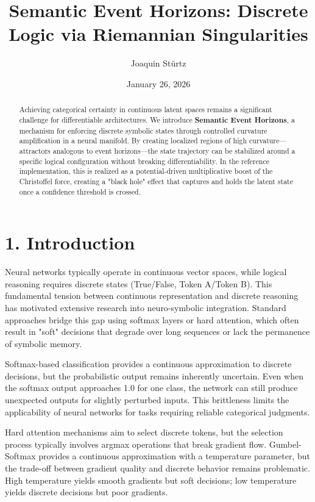 \documentclass[12pt,letterpaper,twoside]{article}
\title{Semantic Event Horizons: Discrete Logic via Riemannian Singularities}
\author{Joaquin Stürtz}
\date{January 26, 2026}
\affil{Independent Researcher}
\begin{document}
\maketitle

\begin{abstract}
Achieving categorical certainty in continuous latent spaces remains a significant challenge for differentiable architectures. We introduce \textbf{Semantic Event Horizons}, a mechanism for enforcing discrete symbolic states through controlled curvature amplification in a neural manifold. By creating localized regions of high curvature—attractors analogous to event horizons—the state trajectory can be stabilized around a specific logical configuration without breaking differentiability. In the reference implementation, this is realized as a potential-driven multiplicative boost of the Christoffel force, creating a "black hole" effect that captures and holds the latent state once a confidence threshold is crossed.
\end{abstract}

\section{1. Introduction}

Neural networks typically operate in continuous vector spaces, while logical reasoning requires discrete states (True/False, Token A/Token B). This fundamental tension between continuous representation and discrete reasoning has motivated extensive research into neuro-symbolic integration. Standard approaches bridge this gap using softmax layers or hard attention, which often result in "soft" decisions that degrade over long sequences or lack the permanence of symbolic memory.

Softmax-based classification provides a continuous approximation to discrete decisions, but the probabilistic output remains inherently uncertain. Even when the softmax output approaches 1.0 for one class, the network can still produce unexpected outputs for slightly perturbed inputs. This brittleness limits the applicability of neural networks for tasks requiring reliable categorical judgments.

Hard attention mechanisms aim to select discrete tokens, but the selection process typically involves argmax operations that break gradient flow. Gumbel-Softmax provides a continuous approximation with a temperature parameter, but the trade-off between gradient quality and discrete behavior remains problematic. High temperature yields smooth gradients but soft decisions; low temperature yields discrete decisions but poor gradients.
\end{document}

